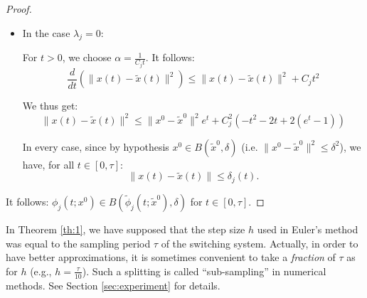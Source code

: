 \begin{proof}
\begin{itemize}
%


\item In the case $\lambda_j =0$:

For $t>0$, we choose $ \alpha = \frac{1}{C_j t}$. It follows:
$$\frac{d}{dt}(\|x(t)-\tilde x(t)\|^2)
 \leq   \|x(t)-\tilde x(t)\|^2 + C_jt^2
 $$
 
We thus get:
$$ \|x(t)-\tilde{x}(t)\|^2 \leq \|x^0-\tilde{x}^0\|^2 e^{t} + C_j^2 (- t^2 - 2t + 2 (e^t - 1)) $$






In every case, since by hypothesis $x^0\in B(\tilde{x}^0,\delta)$ (i.e. $\| x^0 - \tilde{x}^0\|^2 \leq \delta^2$),
we have, for all $t\in [0,\tau]$:
\[
\|x(t)-\tilde{x}(t)\| \leq 
\delta_j(t).
 \]

 
 
 \end{itemize}
 
 
 
 It follows: $\phi_j(t;x^0)\in B(\tilde{\phi}_j(t;\tilde{x}^0), \delta)$ for $t\in [0,\tau]$.
%




\end{proof}



\vspace{1em}

\begin{remark}
In Theorem \ref{th:1}, we have supposed that the step size $h$ used in Euler's method was equal to the sampling period $\tau$ of the switching system.
Actually, in order to have better approximations, it is sometimes convenient
to take a {\em fraction} of $\tau$ as for $h$ (e.g., $h=\frac{\tau}{10}$).
Such a splitting is called ``sub-sampling'' in numerical methods.
See
Section \ref{sec:experiment} for details.
\end{remark}

\vspace{1em}


